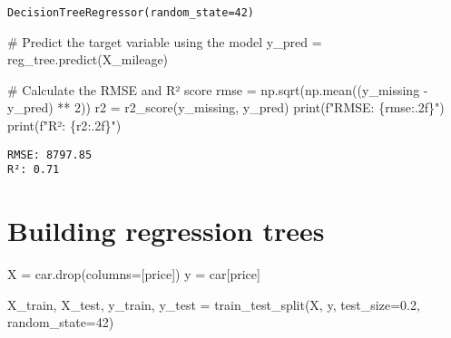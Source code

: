 \documentclass[
  letterpaper,
  DIV=11,
  numbers=noendperiod]{scrreprt}
\newenvironment{Shaded}{\begin{snugshade}}{\end{snugshade}}
\newcommand{\BuiltInTok}[1]{\textcolor[rgb]{0.00,0.23,0.31}{#1}}
\newcommand{\CommentTok}[1]{\textcolor[rgb]{0.37,0.37,0.37}{#1}}
\newcommand{\DecValTok}[1]{\textcolor[rgb]{0.68,0.00,0.00}{#1}}
\newcommand{\FloatTok}[1]{\textcolor[rgb]{0.68,0.00,0.00}{#1}}
\newcommand{\NormalTok}[1]{\textcolor[rgb]{0.00,0.23,0.31}{#1}}
\newcommand{\OperatorTok}[1]{\textcolor[rgb]{0.37,0.37,0.37}{#1}}
\newcommand{\SpecialCharTok}[1]{\textcolor[rgb]{0.37,0.37,0.37}{#1}}
\newcommand{\SpecialStringTok}[1]{\textcolor[rgb]{0.13,0.47,0.30}{#1}}
\newcommand{\StringTok}[1]{\textcolor[rgb]{0.13,0.47,0.30}{#1}}
\begin{document}
\begin{verbatim}
DecisionTreeRegressor(random_state=42)
\end{verbatim}

\begin{Shaded}
\begin{Highlighting}[]
\CommentTok{\# Predict the target variable using the model}
\NormalTok{y\_pred }\OperatorTok{=}\NormalTok{ reg\_tree.predict(X\_mileage)}

\CommentTok{\# Calculate the RMSE and R² score}
\NormalTok{rmse }\OperatorTok{=}\NormalTok{ np.sqrt(np.mean((y\_missing }\OperatorTok{{-}}\NormalTok{ y\_pred) }\OperatorTok{**} \DecValTok{2}\NormalTok{))}
\NormalTok{r2 }\OperatorTok{=}\NormalTok{ r2\_score(y\_missing, y\_pred)}
\BuiltInTok{print}\NormalTok{(}\SpecialStringTok{f"RMSE: }\SpecialCharTok{\{}\NormalTok{rmse}\SpecialCharTok{:.2f\}}\SpecialStringTok{"}\NormalTok{)}
\BuiltInTok{print}\NormalTok{(}\SpecialStringTok{f"R²: }\SpecialCharTok{\{}\NormalTok{r2}\SpecialCharTok{:.2f\}}\SpecialStringTok{"}\NormalTok{)}
\end{Highlighting}
\end{Shaded}

\begin{verbatim}
RMSE: 8797.85
R²: 0.71
\end{verbatim}

\section{Building regression trees}\label{building-regression-trees}

\begin{Shaded}
\begin{Highlighting}[]
\NormalTok{X }\OperatorTok{=}\NormalTok{ car.drop(columns}\OperatorTok{=}\NormalTok{[}\StringTok{\textquotesingle{}price\textquotesingle{}}\NormalTok{])}
\NormalTok{y }\OperatorTok{=}\NormalTok{ car[}\StringTok{\textquotesingle{}price\textquotesingle{}}\NormalTok{]}
\end{Highlighting}
\end{Shaded}

\begin{Shaded}
\begin{Highlighting}[]
\NormalTok{X\_train, X\_test, y\_train, y\_test }\OperatorTok{=}\NormalTok{ train\_test\_split(X, y, test\_size}\OperatorTok{=}\FloatTok{0.2}\NormalTok{, random\_state}\OperatorTok{=}\DecValTok{42}\NormalTok{)}
\end{Highlighting}
\end{Shaded}
\end{document}
